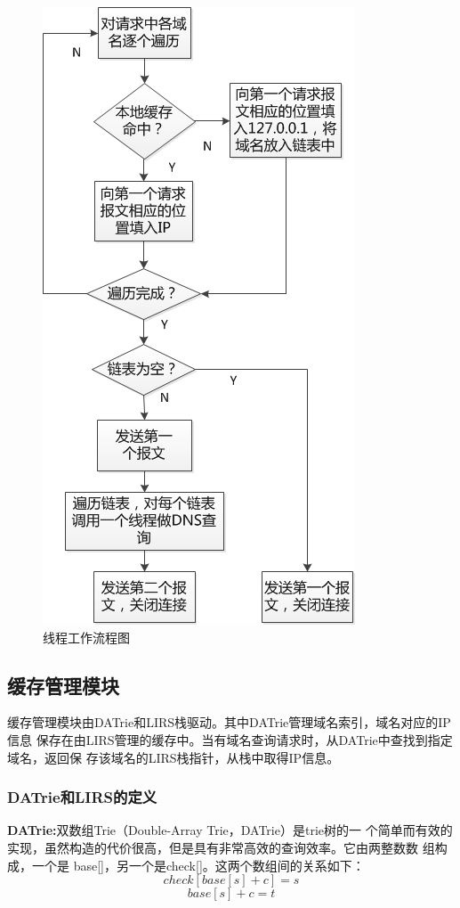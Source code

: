 \begin{figure}[H]
\centering
\includegraphics[keepaspectratio, scale=1]{pitures/xianchengliuchengtu.png}
\caption{线程工作流程图} 
\end{figure}




\subsection{缓存管理模块} 

缓存管理模块由DATrie和LIRS栈驱动。其中DATrie管理域名索引，域名对应的IP信息
保存在由LIRS管理的缓存中。当有域名查询请求时，从DATrie中查找到指定域名，返回保
存该域名的LIRS栈指针，从栈中取得IP信息。
\subsubsection{DATrie和LIRS的定义}
\noindent \textbf{DATrie:}双数组Trie（Double-Array Trie，DATrie）是trie树的一
个简单而有效的实现，虽然构造的代价很高，但是具有非常高效的查询效率。它由两整数数
组构成，一个是 base[]，另一个是check[]。这两个数组间的关系如下：$$check[base[s] + c] = s$$
$$base[s]+ c = t$$


